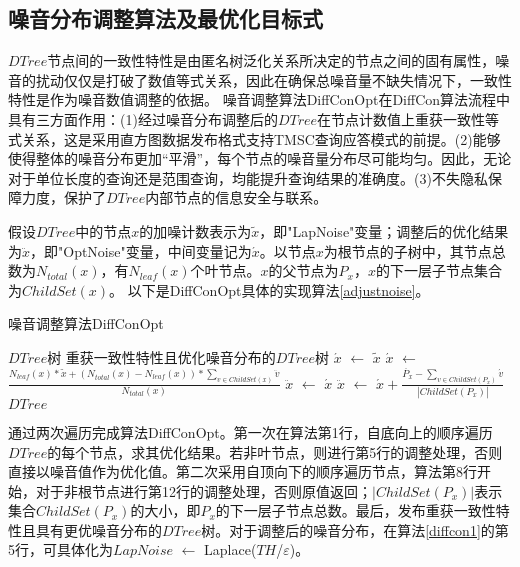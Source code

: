 

\subsection{噪音分布调整算法及最优化目标式}

$DTree$节点间的一致性特性是由匿名树泛化关系所决定的节点之间的固有属性，噪音的扰动仅仅是打破了数值等式关系，因此在确保总噪音量不缺失情况下，一致性特性是作为噪音数值调整的依据。
噪音调整算法DiffConOpt在DiffCon算法流程中具有三方面作用：(1)经过噪音分布调整后的$DTree$在节点计数值上重获一致性等式关系，这是采用直方图数据发布格式支持TMSC查询应答模式的前提。(2)能够使得整体的噪音分布更加“平滑”，每个节点的噪音量分布尽可能均匀。因此，无论对于单位长度的查询还是范围查询，均能提升查询结果的准确度。(3)不失隐私保障力度，保护了$DTree$内部节点的信息安全与联系。

假设$DTree$中的节点$x$的加噪计数表示为$\tilde{x}$，即"LapNoise"变量；调整后的优化结果为$\ddot{x}$，即"OptNoise"变量，中间变量记为$\acute{x}$。以节点$x$为根节点的子树中，其节点总数为$N_{total}(x)$，有$N_{leaf}(x)$个叶节点。$x$的父节点为$P_{x}$，$x$的下一层子节点集合为$ChildSet(x)$。
以下是DiffConOpt具体的实现算法\ref{adjustnoise}。

\begin{algorithm}[H]
	\caption{噪音调整算法DiffConOpt} 
	\label{adjustnoise}
	\begin{algorithmic}[1]
		\REQUIRE $DTree$树
		\ENSURE 重获一致性特性且优化噪音分布的$DTree$树
		\STATE $\acute{x}$ $\leftarrow$ $\tilde{x}$ 
		\ELSE
		\STATE  $\acute{x}$ $\leftarrow$ $\frac{{N_{leaf}(x) * \tilde{x} + (N_{total}(x) - N_{leaf}(x)) * \sum\nolimits_{v \in ChildSet(x)} {\ddot{v}}}}{{N_{total}(x)}}$
		\ENDIF
		\ENDFOR
		\STATE  $\ddot{x}$ $\leftarrow$ $\acute{x}$
		\ELSE
		\STATE  $\ddot{x}$ $\leftarrow$ $\acute{x} + \frac{{\ddot{P_{x}} - \sum\nolimits_{v \in ChildSet(P_{x})} {\acute{v}}}}{|ChildSet(P_{x})|}$
		\ENDIF
		\ENDFOR
		\RETURN $DTree$
	\end{algorithmic}
\end{algorithm}

通过两次遍历完成算法DiffConOpt。第一次在算法第1行，自底向上的顺序遍历$DTree$的每个节点，求其优化结果。若非叶节点，则进行第5行的调整处理，否则直接以噪音值作为优化值。第二次采用自顶向下的顺序遍历节点，算法第8行开始，对于非根节点进行第12行的调整处理，否则原值返回；$|ChildSet(P_{x})|$表示集合$ChildSet(P_{x})$的大小，即$P_{x}$的下一层子节点总数。最后，发布重获一致性特性且具有更优噪音分布的$DTree$树。对于调整后的噪音分布，在算法\ref{diffcon1}的第5行，可具体化为$LapNoise$ $\leftarrow$ Laplace($TH$/$\varepsilon$)。

